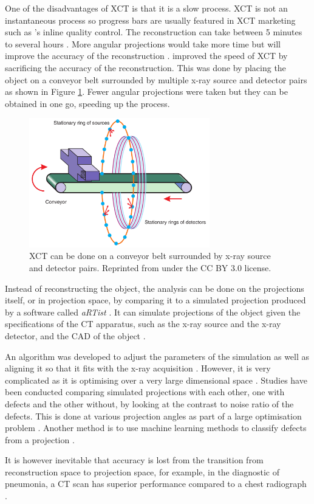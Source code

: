 One of the disadvantages of XCT is that it is a slow process. XCT is not an instantaneous process so progress bars are usually featured in XCT marketing such as \cite{nikon2015inline}'s inline quality control. The reconstruction can take between 5 minutes to several hours \citep{warnett2016towards}. More angular projections would take more time but will improve the accuracy of the reconstruction \citep{kruth2011computed}. \cite{warnett2016towards} improved the speed of XCT by sacrificing the accuracy of the reconstruction. This was done by placing the object on a conveyor belt surrounded by multiple x-ray source and detector pairs as shown in Figure \ref{fig:literature_conveyor}. Fewer angular projections were taken but they can be obtained in one go, speeding up the process.

\begin{figure}
  \centering
  \includegraphics[width=0.7\textwidth]{../figures/literatureReview/literature_conveyor.png}
  \caption{XCT can be done on a conveyor belt surrounded by x-ray source and detector pairs. Reprinted from \cite{warnett2016towards} under the CC BY 3.0 license.}
  \label{fig:literature_conveyor}
\end{figure}

Instead of reconstructing the object, the analysis can be done on the projections itself, or in projection space, by comparing it to a simulated projection produced by a software called \emph{aRTist} \citep{bellon2007artist, jaenisch2008artist, bellon2012radiographic}. It can simulate projections of the object given the specifications of the CT apparatus, such as the x-ray source and the x-ray detector, and the CAD of the object \citep{bellon2011simulation, deresch2012simulating}.

An algorithm was developed to adjust the parameters of the simulation as well as aligning it so that it fits with the x-ray acquisition \citep{brierley2018optimized}. However, it is very complicated as it is optimising over a very large dimensional space \citep{brierley2018optimized}. Studies have been conducted comparing simulated projections with each other, one with defects and the other without, by looking at the contrast to noise ratio of the defects. This is done at various projection angles as part of a large optimisation problem \citep{brierley2018optimized}. Another method is to use machine learning methods to classify defects from a projection \citep{rale2009comparison}.

It is however inevitable that accuracy is lost from the transition from reconstruction space to projection space, for example, in the diagnostic of pneumonia, a CT scan has superior performance compared to a chest radiograph \citep{hayden2009chest}.
